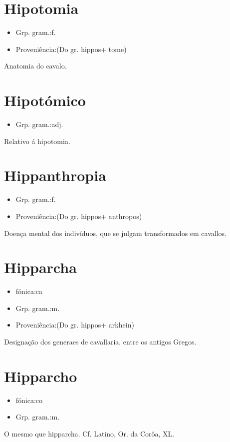 \documentclass{article}
\begin{document}
\section{Hipotomia}
\begin{itemize}
\item {Grp. gram.:f.}
\end{itemize}
\begin{itemize}
\item {Proveniência:(Do gr. \textunderscore hippos\textunderscore  + \textunderscore tome\textunderscore )}
\end{itemize}
Anatomia do cavalo.
\section{Hipotómico}
\begin{itemize}
\item {Grp. gram.:adj.}
\end{itemize}
Relativo á hipotomia.
\section{Hippanthropia}
\begin{itemize}
\item {Grp. gram.:f.}
\end{itemize}
\begin{itemize}
\item {Proveniência:(Do gr. \textunderscore hippos\textunderscore  + \textunderscore anthropos\textunderscore )}
\end{itemize}
Doença mental dos indivíduos, que se julgam transformados em cavallos.
\section{Hipparcha}
\begin{itemize}
\item {fónica:ca}
\end{itemize}
\begin{itemize}
\item {Grp. gram.:m.}
\end{itemize}
\begin{itemize}
\item {Proveniência:(Do gr. \textunderscore hippos\textunderscore  + \textunderscore arkhein\textunderscore )}
\end{itemize}
Designação dos generaes de cavallaria, entre os antigos Gregos.
\section{Hipparcho}
\begin{itemize}
\item {fónica:co}
\end{itemize}
\begin{itemize}
\item {Grp. gram.:m.}
\end{itemize}
O mesmo que \textunderscore hipparcha\textunderscore . Cf. Latino, \textunderscore Or. da Corôa\textunderscore , XL.
\end{document}
